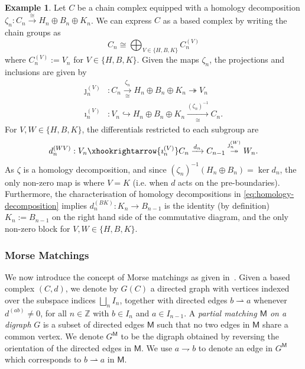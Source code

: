 \documentclass[11pt, table, nothms]{amsart}
\theoremstyle{definition}
\newtheorem{example}[theorem]{Example}
\newcommand{\Z}{\mathbb{Z}}
\newcommand{\sM}{\mathsf{M}}
\begin{document}
{\begin{example}\label{ex:homology_decomposition_based}
    Let $C$ be a chain complex equipped with a homology decomposition $\zeta_n: C_n \xrightarrow{\cong} H_n \oplus B_n \oplus K_n$. We can express $C$ as a based complex by writing the chain groups as 
    \[C_n \cong  \bigoplus_{V \in \{H, B,K\}} C^{(V)}_n \] 
    where $C^{(V)}_n := V_n$ for $V \in \{H, B,K\}$. Given the maps $\zeta_n$, the projections and inclusions are given by
    \begin{align*}
        \jmath_n^{(V)} &: C_n \xrightarrow[\cong]{\zeta_n} H_n \oplus B_n \oplus K_n \twoheadrightarrow V_n  \\ \imath_n^{(V)}&: V_n \hookrightarrow H_n \oplus B_n \oplus K_n \xrightarrow[\cong]{(\zeta_n)^{-1}} C_n .
    \end{align*}
For $V,W \in \{H, B, K\}$, the differentials restricted to each subgroup are
\begin{equation} \label{eq:based_restricted_diff}
    d_n^{(WV)} : V_n \xhookrightarrow{\imath^{(V)}_n} C_n \xrightarrow{d_n} C_{n-1} \overset{\jmath^{(W)}_n} {\twoheadrightarrow} W_n.
\end{equation}
As $\zeta$ is a homology decomposition, 
and since $(\zeta_n)^{-1}(H_n \oplus B_n) = \ker d_n$, the only non-zero map is where $V = K$ (i.e. when $d$ acts on the pre-boundaries). 
Furthermore,  the characterisation of homology decompositions in \cref{eq:homology-decomposition} implies  $d_n^{(BK)}: K_n \to B_{n-1}$ is the identity (by definition) $K_n := B_{n-1}$ on the right hand side of the commutative diagram, and the only non-zero block for $V,W \in \{H,B,K\}$. 
\end{example}

\subsubsection{Morse Matchings}
We now introduce the concept of Morse matchings as given in~\cite{Skoldberg2006MorseViewpoint}. Given a based complex $(C, d)$, we denote by $G(C)$ a directed graph with vertices indexed over the subspace indices $\bigsqcup_n I_n$, together with directed edges $b \rightharpoonup a$ whenever $d^{(ab)}\neq 0$, for all $n \in \Z$ with $b \in I_n$ and $a \in I_{n-1}$. 
A \emph{partial matching $\sM$ on a digraph} $G$ is a subset of directed edges $\sM$ such that no two edges in $\sM$ share a common vertex. 
We denote $G^\sM$ to be the digraph obtained by reversing the orientation of the directed edges in $\sM$. We use $a \rightharpoondown b$ to denote an edge in $G^\sM$ which corresponds to $b \rightharpoonup a$ in $\sM$.

}
\end{document}
